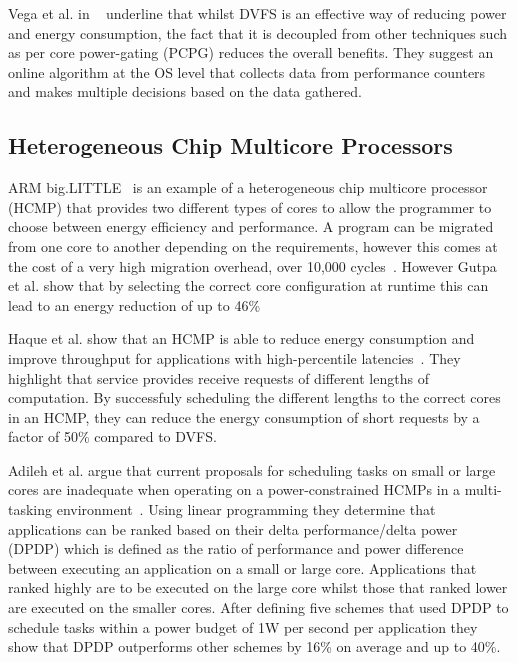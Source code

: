 Vega et al. in ~\cite{vega2013crank} underline that whilst DVFS is an effective way of reducing power and energy consumption, the fact that it is decoupled from other techniques such as per core power-gating (PCPG) reduces the overall benefits.
They suggest an online algorithm at the OS level that collects data from performance counters and makes multiple decisions based on the data gathered.

\subsection{Heterogeneous Chip Multicore Processors}
ARM big.LITTLE~\cite{armbig} is an example of a heterogeneous chip multicore processor (HCMP) that provides two different types of cores to allow the programmer to choose between energy efficiency and performance.
A program can be migrated from one core to another depending on the requirements, however this comes at the cost of a very high migration overhead, over 10,000 cycles~\cite{armbig}.
However Gutpa et al. show that by selecting the correct core configuration at runtime this can lead to an energy reduction of up to 46\%

Haque et al. show that an HCMP is able to reduce energy consumption and improve throughput for applications with high-percentile latencies~\cite{tailAMP2017}.
They highlight that service provides receive requests of different lengths of computation.
By successfuly scheduling the different lengths to the correct cores in an HCMP, they can reduce the energy consumption of short requests by a factor of 50\% compared to DVFS.


Adileh et al. argue that current proposals for scheduling tasks on small or large cores are inadequate when operating on a power-constrained HCMPs in a multi-tasking environment~\cite{adileh2016power}.
Using linear programming they determine that applications can be ranked based on their delta performance/delta power (DPDP) which is defined as the ratio of performance and power difference between executing an application on a small or large core.
Applications that ranked highly are to be executed on the large core whilst those that ranked lower are executed on the smaller cores.
After defining five schemes that used DPDP to schedule tasks within a power budget of 1W per second per application they show that DPDP outperforms other schemes by 16\% on average and up to 40\%.
 
